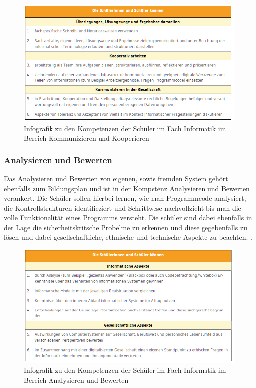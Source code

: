 \begin{figure}[H]
	\centering
	\includegraphics[width=\textwidth,height=\textheight,keepaspectratio]{images/team.png}
	\caption{Infografik zu den Kompetenzen der Schüler im Fach Informatik im Bereich Kommunizieren und Kooperieren}
	\label{Kommunizieren und Kooperieren Infografik}
\end{figure}

\subsubsection{Analysieren und Bewerten}

Das Analysieren und Bewerten von eigenen, sowie fremden System gehört ebenfalls zum Bildungsplan und ist in der Kompetenz Analysieren und Bewerten verankert. Die Schüler sollen hierbei lernen, wie man Programmcode analysiert, die Kontrollstrukturen identifieziert und Schrittwese nachvollzieht bis man die volle Funktionalität eines Programms versteht. Die schüler sind dabei ebenfalls in der Lage die sicherheitskritsche Probelme zu erkennen und diese gegebenfalls zu lösen und dabei gesellschaftliche, ethnische und technische Aspekte zu beachten.
\cite{Analy}.

\begin{figure}[H]
	\centering
	\includegraphics[width=\textwidth,height=\textheight,keepaspectratio]{images/Analysieren.png}
	\caption{Infografik zu den Kompetenzen der Schüler im Fach Informatik im Bereich Analysieren und Bewerten}
	\label{Analysieren und Bewerten Infografik}
\end{figure}

